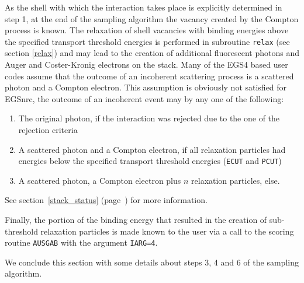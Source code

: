 As the shell with which the interaction takes place is explicitly determined
in step 1, at the end of the sampling algorithm the vacancy created
by the Compton process is known. The relaxation of shell vacancies
with binding energies above the specified transport threshold
energies is performed in subroutine {\tt relax} (see section \ref{relax}) and
may lead to the creation of additional fluorescent photons and
Auger and Coster-Kronig electrons on the stack. Many of the
EGS4 based user codes assume that the outcome of an incoherent scattering
process is a scattered photon and a Compton electron. This assumption
is obviously not satisfied for EGSnrc, the outcome of an incoherent
event may by any one of the following:
\begin{enumerate}
\item
The original photon, if the interaction was rejected due to the one
of the rejection criteria
\item
A scattered photon and a Compton electron, if all relaxation particles
had energies below the specified transport threshold energies
({\tt ECUT} and {\tt PCUT})
\item
A scattered photon, a Compton electron plus $n$ relaxation particles, else.
\end{enumerate}
See section~\ref{stack_status} (page~\pageref{stack_status}) for more
information.

Finally, the portion of the binding energy that resulted in the creation
of sub-threshold relaxation particles is made known to the user via
a call to the scoring routine {\tt AUSGAB} with the argument {\tt IARG=4}.

We conclude this section with some details about steps 3, 4 and 6
of the sampling algorithm.

